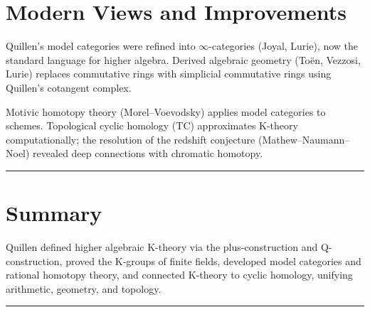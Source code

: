 \section{Modern Views and Improvements}

Quillen's model categories were refined into $\infty$-categories (Joyal,
Lurie), now the standard language for higher algebra. Derived algebraic
geometry (To\"{e}n, Vezzosi, Lurie) replaces commutative rings with
simplicial commutative rings using Quillen's cotangent complex.

Motivic homotopy theory (Morel--Voevodsky) applies model categories to
schemes. Topological cyclic homology (TC) approximates K-theory
computationally; the resolution of the redshift conjecture
(Mathew--Naumann--Noel) revealed deep connections with chromatic homotopy.

\begin{center}\rule{0.5\linewidth}{0.5pt}\end{center}

\section*{Summary}

Quillen defined higher algebraic K-theory via the plus-construction and
Q-construction, proved the K-groups of finite fields, developed model
categories and rational homotopy theory, and connected K-theory to cyclic
homology, unifying arithmetic, geometry, and topology.

\begin{center}\rule{0.5\linewidth}{0.5pt}\end{center}
